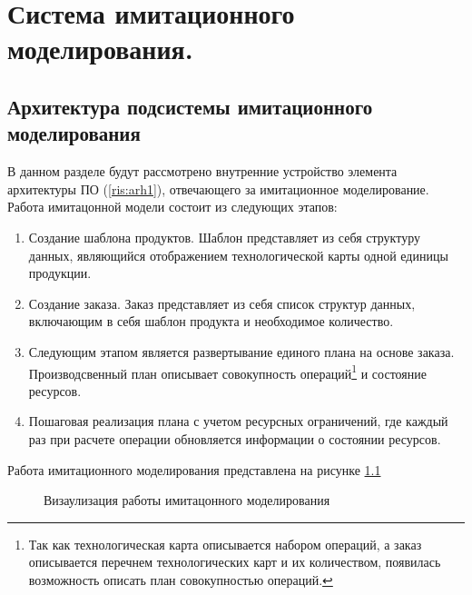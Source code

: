 \chapter{Система имитационного моделирования.}

\section{Архитектура подсистемы имитационного моделирования}

В данном разделе будут рассмотрено внутренние устройство элемента архитектуры ПО (\ref{ris:arh1}), отвечающего за имитационное моделирование. 
Работа имитацонной модели состоит из следующих этапов:

\begin{enumerate}
    \item Создание шаблона продуктов. Шаблон представляет из себя структуру данных, являющийся отображением технологической карты одной единицы продукции.
	\item Создание заказа. Заказ представляет из себя список структур данных, включающим в себя шаблон продукта и необходимое количество.
	\item Следующим этапом является развертывание единого плана на основе заказа. Производсвенный план описывает совокупность операций\footnote{Так как технологическая карта описывается набором операций, а заказ описывается перечнем технологических карт и их количеством, появилась возможность описать план совокупностью операций.} и состояние ресурсов.
    \item Пошаговая реализация плана с учетом ресурсных ограничений, где каждый раз при расчете операции обновляется информации о состоянии ресурсов.
\end{enumerate}

Работа имитационного моделирования представлена на рисунке \ref{ris:alg}
\begin{figure}[H]
    \caption{Визаулизация работы имитацонного моделирования}
    \label{ris:alg}
\end{figure}

